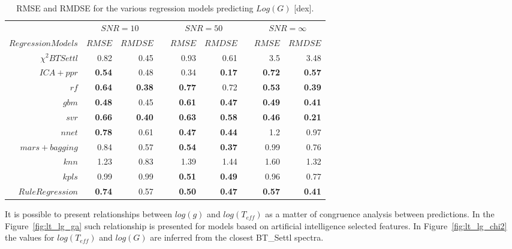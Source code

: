 %
%
\begin{table}\centering
\begin{tabular}{@{}rrrcrrcrr@{}}\toprule
& \multicolumn{2}{c}{$SNR = 10$} & \phantom{ab}& \multicolumn{2}{c}{$SNR = 50$} &
\phantom{ab} & \multicolumn{2}{c}{$SNR = \infty$}\\
\cmidrule{2-3} \cmidrule{5-6} \cmidrule{8-9}
$Regression Models$ & $RMSE$ & $RMDSE$ && $RMSE$ & $RMDSE$     && $RMSE$       & $RMDSE$ \\ \midrule
$\chi^2 BTSettl$    &  0.82 & 0.45        && 0.93   & 0.61     && 3.5          & 3.48 \\
$ ICA+ ppr$         & \bf{0.54} & 0.48     && 0.34  & \bf{0.17} && \bf{0.72}   & \bf{0.57} \\
$rf $               & \bf{0.64} & \bf{0.38} && \bf{0.77} & 0.72    && \bf{0.53} & \bf{0.39} \\
$gbm $              & \bf{0.48} & 0.45    && \bf{0.61}  & \bf{0.47} && \bf{0.49} & \bf{0.41} \\
$ svr $             & \bf{0.66} & \bf{0.40} && \bf{0.63} & \bf{0.58}  && \bf{0.46}  & \bf{0.21} \\
$ nnet $            & \bf{0.78} & 0.61  && \bf{0.47} & \bf{0.44} && 1.2    & 0.97 \\
$ mars+ bagging $   & 0.84      & 0.57      && \bf{0.54} & \bf{0.37} && 0.99    & 0.76 \\
$knn  $             & 1.23      & 0.83      && 1.39 &   1.44     &&  1.60 & 1.32 \\
$ kpls $            & 0.99       & 0.99    && \bf{0.51} & \bf{0.49} && 0.96     & 0.77 \\
$Rule Regression $  & \bf{0.74} & 0.57    && \bf{0.50} & \bf{0.47}  && \bf{0.57} &  \bf{0.41} \\

\bottomrule
\end{tabular}
\caption {RMSE and RMDSE for the various regression models predicting $Log(G)$ [dex].} 
\label{tab:models_G_rmse} 
\end{table}


It is possible to present relationships between $log(g)$ and $log(T_{eff})$
as a matter of congruence analysis between predictions. In the Figure~\ref{fig:lt_lg_ga}
such relationship is presented for models based on artificial intelligence selected features.
In Figure~\ref{fig:lt_lg_chi2} the values for $log(T_{eff})$ and $log(G)$ are 
inferred from the closest BT\_Settl spectra.

